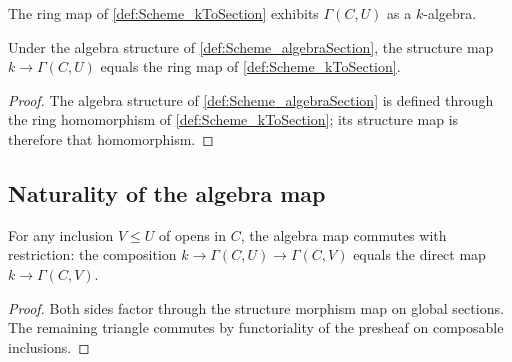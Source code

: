 \begin{definition}\leanok
  \label{def:Scheme_algebraSection}

  The ring map of \cref{def:Scheme_kToSection} exhibits \(\Gamma(C, U)\) as a \(k\)-algebra.
\end{definition}

\begin{lemma}\leanok
  \label{lem:Scheme_algebraMap_eq_kToSection}

  Under the algebra structure of \cref{def:Scheme_algebraSection}, the structure map \(k \to \Gamma(C, U)\) equals the ring map of \cref{def:Scheme_kToSection}.
\end{lemma}

\begin{proof}

  \leanok
  The algebra structure of \cref{def:Scheme_algebraSection} is defined through the ring homomorphism of \cref{def:Scheme_kToSection}; its structure map is therefore that homomorphism.
\end{proof}

\subsection{Naturality of the algebra map}

\begin{lemma}\leanok
  \label{lem:Scheme_kToSection_naturality}

  For any inclusion \(V \le U\) of opens in \(C\), the algebra map commutes with restriction: the composition \(k \to \Gamma(C, U) \to \Gamma(C, V)\) equals the direct map \(k \to \Gamma(C, V)\).
\end{lemma}

\begin{proof}

  \leanok
  Both sides factor through the structure morphism map on global sections. The remaining triangle commutes by functoriality of the presheaf on composable inclusions.
\end{proof}

